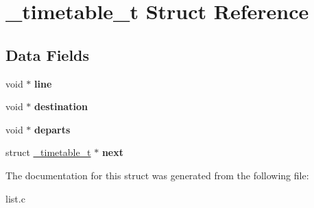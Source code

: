 \hypertarget{struct__timetable__t}{}\section{\+\_\+timetable\+\_\+t Struct Reference}
\label{struct__timetable__t}
\subsection*{Data Fields}
\begin{DoxyCompactItemize}
\item 
\hypertarget{struct__timetable__t_aa01c615868a936abd760a65b07e12e90}{}void $\ast$ {\bfseries line}\label{struct__timetable__t_aa01c615868a936abd760a65b07e12e90}

\item 
\hypertarget{struct__timetable__t_acc185e6f4ae9f581dec36c2c028e961c}{}void $\ast$ {\bfseries destination}\label{struct__timetable__t_acc185e6f4ae9f581dec36c2c028e961c}

\item 
\hypertarget{struct__timetable__t_a115566951b3d329f862d39fd7141a34f}{}void $\ast$ {\bfseries departs}\label{struct__timetable__t_a115566951b3d329f862d39fd7141a34f}

\item 
\hypertarget{struct__timetable__t_a1c49830312d2d5cc9015faf8ff846239}{}struct \hyperlink{struct__timetable__t}{\+\_\+timetable\+\_\+t} $\ast$ {\bfseries next}\label{struct__timetable__t_a1c49830312d2d5cc9015faf8ff846239}

\end{DoxyCompactItemize}


The documentation for this struct was generated from the following file\+:\begin{DoxyCompactItemize}
\item 
list.\+c\end{DoxyCompactItemize}
